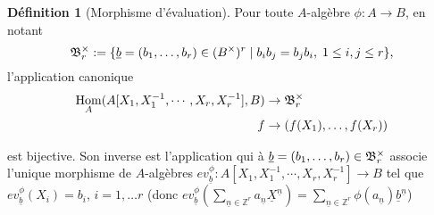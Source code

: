 \documentclass[a4paper, oneside, 12pt]{book}
\theoremstyle{theoremeStyle} %
\theoremstyle{definition} %
\newtheorem{definition}[theoreme]{Définition}
\DeclareMathOperator{\SHom}{Hom}
\newcommand{\Z}{\mathbb{Z}}
\begin{document}
\begin{definition}[Morphisme d'évaluation]Pour toute $A$-algèbre $\phi:A\rightarrow B$, en notant
 $$\frak{B}^\times_r:= \lbrace \underline{b}=(b_1,\dots, b_r)\in (B^\times)^r\;|\; b_ib_j=b_jb_i,\; 1\leq i,j\leq r\rbrace,$$  l'application canonique
	\begin{align*} \SHom_A(A[X_1,X_1^{-1},\cdots, X_r,X_r^{-1}],B) &\to \frak{B}_r^\times \\ f&\to (f(X_1),\dots, f(X_r))\end{align*}

est bijective. Son inverse est l'application qui à $\underline{b}=(b_1,\dots, b_r)\in \frak{B}^\times_r$ associe l'unique morphisme de $A$-algèbres $ev_{\underline{b}}^\phi:A[X_1,X_1^{-1},\cdots, X_r,X_r^{-1}]\rightarrow B$ tel que $ev_{\underline{b}}^\phi(X_i)=b_i$, $i=1,\dots r$ (donc $ev_{\underline{b}}^\phi(\sum_{\underline{n}\in \Z^r}a_{\underline{n}}\underline{X}^{\underline{n}})=\sum_{\underline{n}\in \Z^r}\phi(a_{\underline{n}})\underline{b}^{\underline{n}}$)\end{definition}
\end{document}
